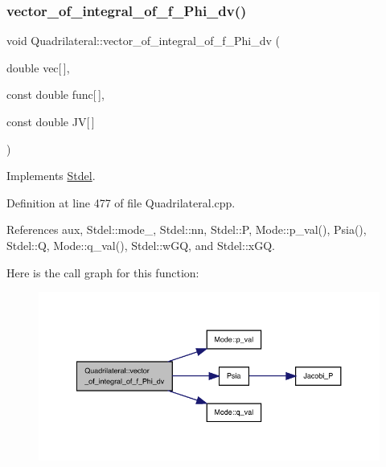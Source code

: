 \subsubsection{\texorpdfstring{vector\+\_\+of\+\_\+integral\+\_\+of\+\_\+f\+\_\+\+Phi\+\_\+dv()}{vector\_of\_integral\_of\_f\_Phi\_dv()}\hspace{0.1cm}{\footnotesize\ttfamily [1/2]}}
{\footnotesize\ttfamily void Quadrilateral\+::vector\+\_\+of\+\_\+integral\+\_\+of\+\_\+f\+\_\+\+Phi\+\_\+dv (\begin{DoxyParamCaption}\item[{double}]{vec\mbox{[}$\,$\mbox{]},  }\item[{const double}]{func\mbox{[}$\,$\mbox{]},  }\item[{const double}]{JV\mbox{[}$\,$\mbox{]} }\end{DoxyParamCaption})\hspace{0.3cm}{\ttfamily [virtual]}}



Implements \hyperlink{classStdel_aa5ef347c02106753c2d3961b59a7309e}{Stdel}.



Definition at line 477 of file Quadrilateral.\+cpp.



References aux, Stdel\+::mode\+\_\+, Stdel\+::nn, Stdel\+::P, Mode\+::p\+\_\+val(), Psia(), Stdel\+::Q, Mode\+::q\+\_\+val(), Stdel\+::w\+GQ, and Stdel\+::x\+GQ.

Here is the call graph for this function\+:
\nopagebreak
\begin{figure}[H]
\begin{center}
\leavevmode
\includegraphics[width=350pt]{classQuadrilateral_a8ef93eed8fa22ae11f3736fe3b255038_cgraph}
\end{center}
\end{figure}
\mbox{\label{classQuadrilateral_a0ee1b169fe49cc443684dfe2eb605b17}} 
